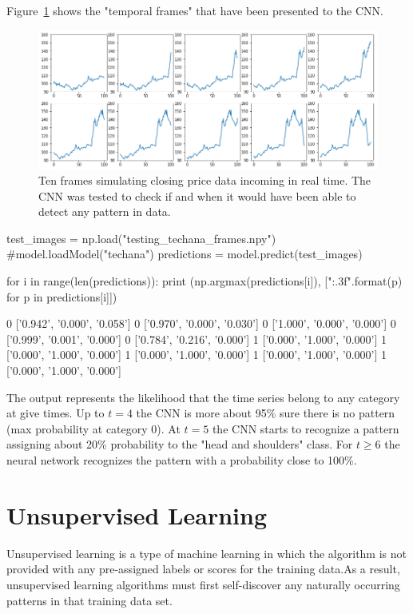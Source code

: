 Figure~\ref{fig:frame_simulation} shows the "temporal frames" that have been presented to the CNN.

\begin{figure}
\centering
\includegraphics[width=\textwidth]{figures/tech_ana_frames}
\caption{Ten frames simulating closing price data incoming in real time. The CNN was tested to check if and when it would have been able to detect any pattern in data.}
\label{fig:frame_simulation}
\end{figure}

\begin{ipython}
test_images = np.load("testing_techana_frames.npy")
#model.loadModel("techana")
predictions = model.predict(test_images)

for i in range(len(predictions)):
    print (np.argmax(predictions[i]), ["{:.3f}".format(p) for p in predictions[i]])
\end{ipython}
\begin{ioutput}
0 ['0.942', '0.000', '0.058']
0 ['0.970', '0.000', '0.030']
0 ['1.000', '0.000', '0.000']
0 ['0.999', '0.001', '0.000']
0 ['0.784', '0.216', '0.000']
1 ['0.000', '1.000', '0.000']
1 ['0.000', '1.000', '0.000']
1 ['0.000', '1.000', '0.000']
1 ['0.000', '1.000', '0.000']
1 ['0.000', '1.000', '0.000']
\end{ioutput}
\noindent
The output represents the likelihood that the time series  belong to any category at give times. Up to $t=4$ the CNN is more about 95\% sure there is no pattern (max probability at category 0). 
At $t=5$ the CNN starts to recognize a pattern assigning about 20\% probability to the "head and shoulders" class. For $t\geq 6$ the neural network recognizes the pattern with a probability close to 100\%.

\section{Unsupervised Learning}
    
Unsupervised learning is a type of machine learning in which the algorithm is not provided with any pre-assigned labels or scores for the training data.As a result, unsupervised learning algorithms must first self-discover any naturally occurring patterns in that training data set. 
    
